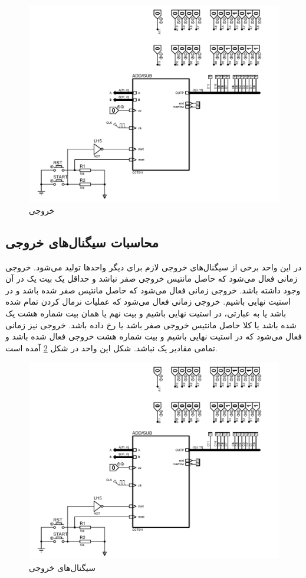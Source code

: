 \documentclass{article}
\begin{document}
\begin{figure}
	\centering
	\includegraphics[scale=0.5, page=3]{./graphics/graphics}
	\caption{خروجی}
	\label{output}
\end{figure}

\subsection{محاسبات سیگنال‌های خروجی}
در این واحد برخی از سیگنال‌های خروجی لازم برای دیگر واحد‌ها تولید می‌شود.
خروجی  زمانی فعال می‌شود که حاصل مانتیس خروجی صفر نباشد و حداقل یک بیت یک در آن وجود داشته باشد.
خروجی  زمانی فعال می‌شود که حاصل مانتیس صفر شده باشد و در استیت نهایی باشیم.
خروجی  زمانی فعال می‌شود که عملیات نرمال کردن تمام شده باشد یا به عبارتی، در استیت نهایی باشیم و بیت نهم یا همان بیت شماره هشت یک شده باشد یا کلا حاصل مانتیس خروجی صفر باشد  یا  رخ داده باشد.
خروجی  نیز زمانی فعال می‌شود که در استیت نهایی باشیم و بیت شماره هشت خروجی فعال شده باشد و تمامی مقادیر  یک نباشد. شکل این واحد در شکل \ref{output-signals} آمده است.

\begin{figure}
	\centering
	\includegraphics[scale=0.6, page=10]{./graphics/graphics}
	\caption{سیگنال‌های خروجی}
	\label{output-signals}
\end{figure}
\end{document}
